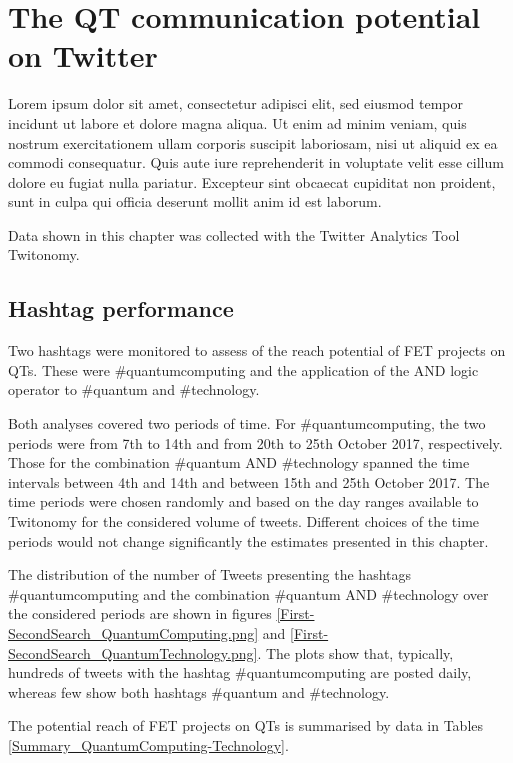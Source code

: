 \chapter{The QT communication potential on Twitter} 
Lorem ipsum dolor sit amet, consectetur adipisci elit, sed eiusmod tempor incidunt ut labore et dolore magna aliqua. Ut enim ad minim veniam, quis nostrum exercitationem ullam corporis suscipit laboriosam, nisi ut aliquid ex ea commodi consequatur. Quis aute iure reprehenderit in voluptate velit esse cillum dolore eu fugiat nulla pariatur. Excepteur sint obcaecat cupiditat non proident, sunt in culpa qui officia deserunt mollit anim id est laborum.

Data shown in this chapter was collected with the Twitter Analytics Tool Twitonomy. 

\section{Hashtag performance}
Two hashtags were monitored to assess of the reach potential of FET projects on QTs. These were \#quantumcomputing and the application of the AND logic operator to \#quantum and \#technology. 

Both analyses covered two periods of time. For \#quantumcomputing, the two periods were from 7th to 14th and from 20th to 25th October 2017, respectively. Those for the combination \#quantum AND \#technology spanned the time intervals between 4th and 14th and between 15th and 25th October 2017. The time periods were chosen randomly and based on the day ranges available to Twitonomy for the considered volume of tweets. Different choices of the time periods would not change significantly the estimates presented in this chapter.  

The distribution of the number of Tweets presenting the hashtags \#quantumcomputing and the combination \#quantum AND \#technology over the considered periods are shown in figures \ref{First-SecondSearch_QuantumComputing.png} and \ref{First-SecondSearch_QuantumTechnology.png}. The plots show that, typically, hundreds of tweets with the hashtag \#quantumcomputing are posted daily, whereas few show both hashtags \#quantum and \#technology. 

The potential reach of FET projects on QTs is summarised by data in Tables \ref{Summary_QuantumComputing-Technology}. 

